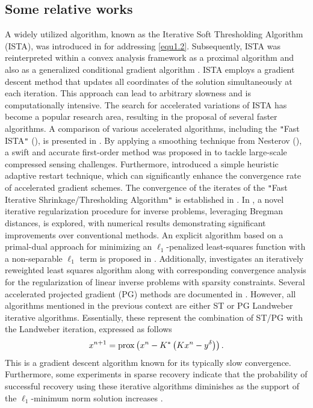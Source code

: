 \documentclass[a4paper,12pt]{article}
\numberwithin{equation}{section}
\begin{document}
\subsection{Some relative works}

\par A widely utilized algorithm, known as the Iterative Soft Thresholding Algorithm (ISTA), was introduced in \cite{DDD04} for addressing \eqref{equ1.2}. Subsequently, ISTA was reinterpreted within a convex analysis framework as a proximal algorithm \cite{CW05} and also as a generalized conditional gradient algorithm \cite{BLM09}. ISTA employs a gradient descent method that updates all coordinates of the solution simultaneously at each iteration. This approach can lead to arbitrary slowness and is computationally intensive. The search for accelerated variations of ISTA has become a popular research area, resulting in the proposal of several faster algorithms. A comparison of various accelerated algorithms, including the \verb+"+Fast ISTA\verb+"+ (\cite{BT09}), is presented in \cite{LBDZZ09}. By applying a smoothing technique from Nesterov (\cite{N05}), a swift and accurate first-order method was proposed in \cite{BBC11} to tackle large-scale compressed sensing challenges. Furthermore, \cite{DC15} introduced a simple heuristic adaptive restart technique, which can significantly enhance the convergence rate of accelerated gradient schemes. The convergence of the iterates of the \verb+"+Fast Iterative Shrinkage/Thresholding Algorithm\verb+"+ is established in \cite{CD15}. In \cite{OBGXY05}, a novel iterative regularization procedure for inverse problems, leveraging Bregman distances, is explored, with numerical results demonstrating significant improvements over conventional methods. An explicit algorithm based on a primal-dual approach for minimizing an $\ell_1$-penalized least-squares function with a non-separable $\ell_1$ term is proposed in \cite{LV11}. Additionally, \cite{FPRW16} investigates an iteratively reweighted least squares algorithm along with corresponding convergence analysis for the regularization of linear inverse problems with sparsity constraints. Several accelerated projected gradient (PG) methods are documented in \cite{BF08,DFL08,FNW07,WNF09}. However, all algorithms mentioned in the previous context are either ST or PG Landweber iterative algorithms. Essentially, these represent the combination of ST/PG with the Landweber iteration, expressed as follows
\begin{equation}\label{equ1.3}
x^{n+1}={\rm prox}\left(x^n-K^{*}\left(Kx^n-y^{\delta}\right)\right).
\end{equation}
This is a gradient descent algorithm known for its typically slow convergence. Furthermore, some experiments in sparse recovery indicate that the probability of successful recovery using these iterative algorithms diminishes as the support of the  $\ell_1$-minimum norm solution increases \cite{LY18,YLHX15}.
\end{document}
